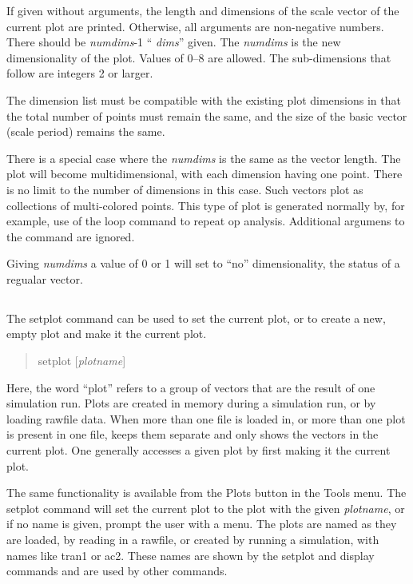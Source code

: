 If given without arguments, the length and dimensions of the scale
vector of the current plot are printed.  Otherwise, all arguments are
non-negative numbers.  There should be {\it numdims\/}-1 ``{\it
dims}'' given.  The {\it numdims} is the new dimensionality of the
plot.  Values of 0--8 are allowed.  The sub-dimensions that follow are
integers 2 or larger.

The dimension list must be compatible with the existing plot
dimensions in that the total number of points must remain the same,
and the size of the basic vector (scale period) remains the same.

There is a special case where the {\it numdims} is the same as the
vector length.  The plot will become multidimensional, with each
dimension having one point.  There is no limit to the number of
dimensions in this case.  Such vectors plot as collections of
multi-colored points.  This type of plot is generated normally by, for
example, use of the {\cb loop} command to repeat op analysis. 
Additional argumens to the command are ignored.

Giving {\it numdims} a value of 0 or 1 will set to ``no''
dimensionality, the status of a regualar vector.

\subsection{}


The {\cb setplot} command can be used to set the current plot, or to
create a new, empty plot and make it the current plot.
\begin{quote}\vt
setplot [{\it plotname\/}]
\end{quote}
Here, the word ``plot'' refers to a group of vectors that are the
result of one {\WRspice} simulation run.  Plots are created in memory
during a simulation run, or by loading rawfile data.  When more than
one file is loaded in, or more than one plot is present in one file,
{\WRspice} keeps them separate and only shows the vectors in the
current plot.  One generally accesses a given plot by first making it
the current plot. 

The same functionality is available from the {\cb Plots} button in the
{\cb Tools} menu.  The {\cb setplot} command will set the current plot
to the plot with the given {\it plotname\/}, or if no name is given,
prompt the user with a menu.  The plots are named as they are loaded,
by reading in a rawfile, or created by running a simulation, with
names like {\vt tran1} or {\vt ac2}.  These names are shown by the
{\cb setplot} and {\cb display} commands and are used by other
commands.

